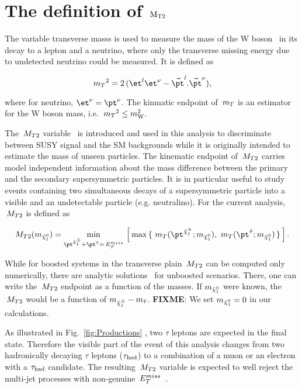 \section{\texorpdfstring{The definition of $\rm {\ensuremath{\,{M_{T2}}}}$}{The definition of MT2}}
\label{sect:mt2def}
The variable transverse masss is used to measure the mass of the W boson~\cite{Arnison:1983rp,Banner:1983jy,Affolder:2000bpa,Abazov:2002bu} in its decay to a lepton and a neutrino, where only the transverse missing energy due to undetected neutrino could be measured. It is defined as 
\begin{linenomath}
\begin{equation}
\label{eq:mtdef}
\mt^{2}= 2\,( \et^l\et^\nu-\vec{\pt}^l.\vec{\pt}^\nu ),
\end{equation}
\end{linenomath}
where for neutrino, $\et^\nu=\pt^\nu$. The kinmatic endpoint of $\,{m_T}$ is an estimator for the W boson mass, i.e. $\,{m_T}^2\leq m_{\rm W}^2$. 

The $\,{M_{T2}}$ variable~\cite{Lester:1999tx,Barr:2003rg} is introduced and used in this analysis to discriminate between SUSY signal and the SM backgrounds while it is originally intended to estimate the mass of unseen particles. The kinematic endpoint of $\,{M_{T2}}$ carries model independent information about the mass difference between the primary and the secondary supersymmetric particles. It is in particular useful to study events containing two simultaneous decays of a supersymmetric particle into a visible and an undetectable particle (e.g. neutralino). For the current analysis, $\,{M_{T2}}$ is defined as
\begin{linenomath}
\begin{equation}
\label{eq:mt2def}
\mttwo(m_{\neutralino})= \min_{\pt^{\chione}+\pt^{\stau}=\met}\,\left[\,\max\,\{ \, \mt(\pt^{\chione};m_{\neutralino}),\,\mt(\pt^{\stau};m_{\neutralino})\,\}\,\right].
\end{equation}
\end{linenomath}
While for boosted systems in the transverse plain $\,{M_{T2}}$ can be computed only numerically, there are analytic solutions~\cite{Cho:2007dh} for unboosted scenarios. There, one can write the $\,{M_{T2}}$ endpoint as a function of the masses. If $m_{\tilde{\chi}^{0}_1}$ were known, the $\,{M_{T2}}$ would be a function of $m_{\tilde{\chi}^{\pm}_1}-m_{\tilde{\tau}}$. \textbf{FIXME}: We set $m_{\tilde{\chi}^{0}_1} =0$ in our calculations.

As illustrated in Fig.~\ref{fig:Productions} , two $\tau$ leptons are expected in the final state. Therefore the visible part of the event of this analysis changes from two hadronically decaying $\tau$ leptons ($\tau_{\rm had}$) to a combination of a muon or an electron with a $\tau_{\rm had}$ candidate. The resulting $\,{M_{T2}}$ variable is expected to well reject the multi-jet processes with non-genuine $\,{E_T^{miss}}$~\cite{CMS-PAS-SUS-12-002}.

